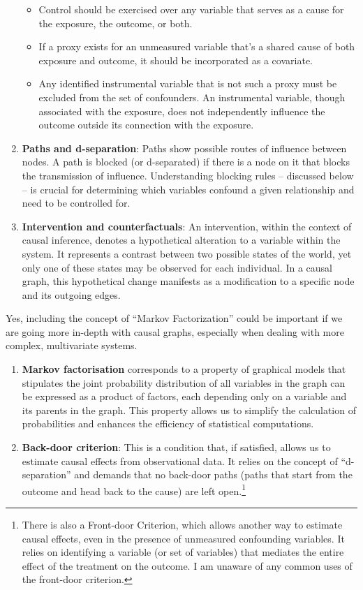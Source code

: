 \documentclass[
  singlecolumn]{report}
\begin{document}
\begin{enumerate}
  \begin{itemize}
  \item
    Control should be exercised over any variable that serves as a cause
    for the exposure, the outcome, or both.
  \item
    If a proxy exists for an unmeasured variable that's a shared cause
    of both exposure and outcome, it should be incorporated as a
    covariate.
  \item
    Any identified instrumental variable that is not such a proxy must
    be excluded from the set of confounders. An instrumental variable,
    though associated with the exposure, does not independently
    influence the outcome outside its connection with the exposure.
  \end{itemize}
\item
  \textbf{Paths and d-separation}: Paths show possible routes of
  influence between nodes. A path is blocked (or d-separated) if there
  is a node on it that blocks the transmission of influence.
  Understanding blocking rules -- discussed below -- is crucial for
  determining which variables confound a given relationship and need to
  be controlled for.
\item
  \textbf{Intervention and counterfactuals}: An intervention, within the
  context of causal inference, denotes a hypothetical alteration to a
  variable within the system. It represents a contrast between two
  possible states of the world, yet only one of these states may be
  observed for each individual. In a causal graph, this hypothetical
  change manifests as a modification to a specific node and its outgoing
  edges.
\end{enumerate}

Yes, including the concept of ``Markov Factorization'' could be
important if we are going more in-depth with causal graphs, especially
when dealing with more complex, multivariate systems.

\begin{enumerate}
\def\labelenumi{\arabic{enumi}.}
\setcounter{enumi}{7}
\item
  \textbf{Markov factorisation} corresponds to a property of graphical
  models that stipulates the joint probability distribution of all
  variables in the graph can be expressed as a product of factors, each
  depending only on a variable and its parents in the graph. This
  property allows us to simplify the calculation of probabilities and
  enhances the efficiency of statistical computations.
\item
  \textbf{Back-door criterion}: This is a condition that, if satisfied,
  allows us to estimate causal effects from observational data. It
  relies on the concept of ``d-separation'' and demands that no
  back-door paths (paths that start from the outcome and head back to
  the cause) are left open.\footnote{There is also a Front-door
    Criterion, which allows another way to estimate causal effects, even
    in the presence of unmeasured confounding variables. It relies on
    identifying a variable (or set of variables) that mediates the
    entire effect of the treatment on the outcome. I am unaware of any
    common uses of the front-door criterion.}
\end{enumerate}
\end{document}

